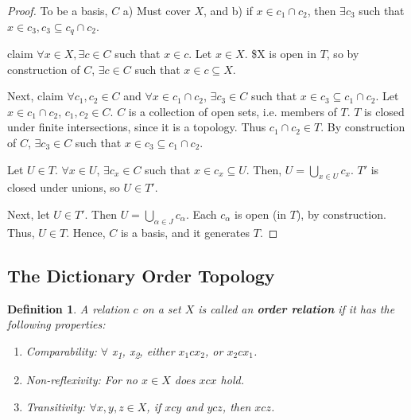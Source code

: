 \documentclass[11pt]{article}
\newtheorem{definition}{Definition}[section]
\begin{document}
\begin{proof}
To be a basis, \(C\) a) Must cover \(X\), and b) if \(x \in c_1\cap c_2\),
then \(\exists c_3\) such that \(x \in c_3, c_3 \subseteq c_q\cap c_2\).

claim \(\forall x \in X, \exists c \in C\) such that \(x \in c\). Let \(x
\in X\). \$X is open in \(T\), so by construction of \(C\), \(\exists c \in
C\) such that \(x \in c \subseteq X\). 

Next, claim \(\forall c_1, c_2 \in C\) and \(\forall x \in c_1\cap c_2\),
\(\exists c_3 \in C\) such that \(x \in c_3 \subseteq c_1\cap c_2\). Let
\(x \in c_1\cap c_2\), \(c_1, c_2 \in C\). \(C\) is a collection of open
sets, i.e. members of \(T\). \(T\) is closed under finite intersections,
since it is a topology. Thus \(c_1\cap c_2 \in T\). By construction of
\(C\), \(\exists c_3 \in C\) such that \(x \in c_3 \subseteq c_1\cap c_2\). 

Let \(U\in T\). \(\forall x \in U\), \(\exists c_x \in C\) such that \(x \in
c_x \subseteq U\). Then, \(U = \bigcup\limits_{x \in U} c_x\). \(T'\) is
closed under unions, so \(U \in T'\).

Next, let \(U \in T'\). Then \(U = \bigcup\limits_{\alpha \in J}
c_{\alpha}\). Each \(c_{\alpha}\) is open (in \(T\)), by
construction. Thus, \(U \in T\). Hence, \(C\) is a basis, and it generates
\(T\).
\end{proof}

\subsection{The Dictionary Order Topology}
\label{sec:org49b527e}
\begin{definition}
A relation \(c\) on a set \(X\) is called an \textbf{order relation} if it
has the following properties:

\begin{enumerate}
\item Comparability: \(\forall\) x\textsubscript{1}, x\textsubscript{2}, either \(x_1 c x_2\), or \(x_2 c
   x_1\).
\item Non-reflexivity: For no \(x \in X\) does \(x c x\) hold.
\item Transitivity: \(\forall x,y,z \in X\), if \(x c y\) and \(y c z\), then
\(x c z\).
\end{enumerate}
\end{definition}
\end{document}
